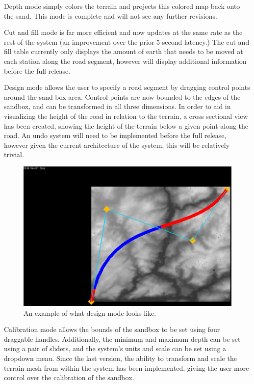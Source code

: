 \documentclass[onecolumn, draftclsnofoot,10pt, compsoc]{IEEEtran}
\begin{document}
Depth mode simply colors the terrain and projects this colored map back onto the sand. This mode is complete and will not see any further revisions.

Cut and fill mode is far more efficient and now updates at the same rate as the rest of the system (an improvement over the prior 5 second latency.) The cut and fill table currently only displays the amount of earth that needs to be moved at each station along the road segment, however will display additional information before the full release.

Design mode allows the user to specify a road segment by dragging control points around the sand box area. Control points are now bounded to the edges of the sandbox, and can be transformed in all three dimensions. In order to aid in visualizing the height of the road in relation to the terrain, a cross sectional view has been created, showing the height of the terrain below a given point along the road. An undo system will need to be implemented before the full release, however given the current architecture of the system, this will be relatively trivial.

\begin{figure}[H]
	\centering
	\includegraphics[width=1.\textwidth]{road}
	\caption{An example of what design mode looks like.}
	\label{fig:road}
\end{figure}

Calibration mode allows the bounds of the sandbox to be set using four draggable handles. Additionally, the minimum and maximum depth can be set using a pair of sliders, and the system's units and scale can be set using a dropdown menu. Since the last version, the ability to transform and scale the terrain mesh from within the system has been implemented, giving the user more control over the calibration of the sandbox.
\end{document}
